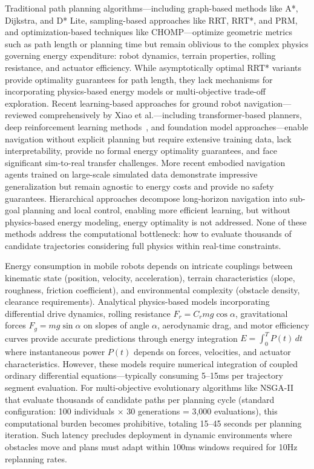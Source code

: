 \documentclass[pdflatex,sn-nature]{sn-jnl}%
\begin{document}
Traditional path planning algorithms—including graph-based methods like A*\cite{Hart1968}, Dijkstra\cite{Stentz1995}, and D* Lite\cite{Koenig2002}, sampling-based approaches like RRT\cite{LaValle2001}, RRT*\cite{Karaman2011}, and PRM\cite{Kavraki1996}, and optimization-based techniques like CHOMP\cite{Ratliff2009}—optimize geometric metrics such as path length or planning time but remain oblivious to the complex physics governing energy expenditure: robot dynamics, terrain properties, rolling resistance, and actuator efficiency\cite{Zhao2019}. While asymptotically optimal RRT* variants\cite{Gammell2021rrt} provide optimality guarantees for path length, they lack mechanisms for incorporating physics-based energy models or multi-objective trade-off exploration. Recent learning-based approaches for ground robot navigation—reviewed comprehensively by Xiao et al.\cite{Xiao2022nav}—including transformer-based planners\cite{Shah2023lmnav,Chen2023navtransformer}, deep reinforcement learning methods~\cite{Zhu2021drlnav,Lu2025energy}, and foundation model approaches\cite{Brohan2022rt1,Driess2023palme}—enable navigation without explicit planning but require extensive training data, lack interpretability, provide no formal energy optimality guarantees, and face significant sim-to-real transfer challenges. More recent embodied navigation agents\cite{Wijmans2020} trained on large-scale simulated data demonstrate impressive generalization but remain agnostic to energy costs and provide no safety guarantees. Hierarchical approaches\cite{Nachum2018} decompose long-horizon navigation into sub-goal planning and local control, enabling more efficient learning, but without physics-based energy modeling, energy optimality is not addressed. None of these methods address the computational bottleneck: how to evaluate thousands of candidate trajectories considering full physics within real-time constraints.

Energy consumption in mobile robots depends on intricate couplings between kinematic state (position, velocity, acceleration), terrain characteristics (slope, roughness, friction coefficient), and environmental complexity (obstacle density, clearance requirements). Analytical physics-based models\cite{Mei2005,Tokekar2014} incorporating differential drive dynamics, rolling resistance $F_r = C_r m g \cos\alpha$, gravitational forces $F_g = m g \sin\alpha$ on slopes of angle $\alpha$, aerodynamic drag, and motor efficiency curves provide accurate predictions through energy integration $E = \int_0^T P(t) \, dt$ where instantaneous power $P(t)$ depends on forces, velocities, and actuator characteristics. However, these models require numerical integration of coupled ordinary differential equations—typically consuming 5--15ms per trajectory segment evaluation. For multi-objective evolutionary algorithms like NSGA-II\cite{Deb2002} that evaluate thousands of candidate paths per planning cycle (standard configuration: 100 individuals × 30 generations = 3,000 evaluations), this computational burden becomes prohibitive, totaling 15--45 seconds per planning iteration. Such latency precludes deployment in dynamic environments where obstacles move and plans must adapt within 100ms windows required for 10Hz replanning rates.
\end{document}
